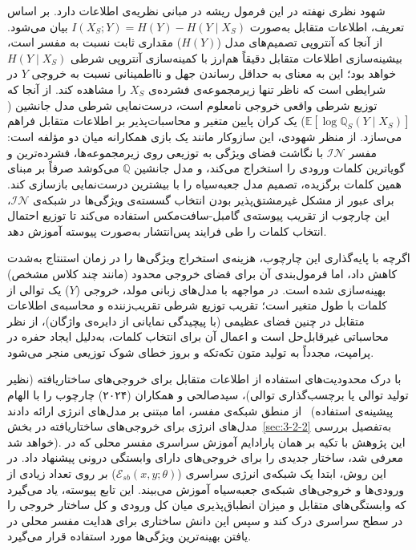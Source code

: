 شهود نظری نهفته در این فرمول ریشه در مبانی نظریه‌ی اطلاعات دارد. بر اساس تعریف، اطلاعات متقابل به‌صورت $I(X_S; Y) = H(Y) - H(Y \mid X_S)$ بیان می‌شود. از آنجا که آنتروپی تصمیم‌های مدل ($H(Y)$) مقداری ثابت نسبت به مفسر است، بیشینه‌سازی اطلاعات متقابل دقیقاً هم‌ارز با کمینه‌سازی آنتروپی شرطی $H(Y \mid X_S)$ خواهد بود؛ این به معنای به حداقل رساندن جهل و نااطمینانی نسبت به خروجی $Y$ در شرایطی است که ناظر تنها زیرمجموعه‌ی فشرده‌ی $X_S$ را مشاهده کند. از آنجا که توزیع شرطی واقعی خروجی نامعلوم است، درست‌نمایی شرطی مدل جانشین ($\mathbb{E}[\log \mathbb{Q}_S(Y \mid X_S)]$) یک کران پایین متغیر و محاسبات‌پذیر بر اطلاعات متقابل فراهم می‌سازد. از منظر شهودی، این سازوکار مانند یک بازی همکارانه میان دو مؤلفه است: مفسر $\mathcal{IN}$ با نگاشت فضای ویژگی به توزیعی روی زیرمجموعه‌ها، فشرده‌ترین و گویاترین کلمات ورودی را استخراج می‌کند، و مدل جانشین $\mathbb{Q}$ می‌کوشد صرفاً بر مبنای همین کلمات برگزیده، تصمیم مدل جعبه‌سیاه را با بیشترین درست‌نمایی بازسازی کند. برای عبور از مشکل غیرمشتق‌پذیر بودن انتخاب گسسته‌ی ویژگی‌ها در شبکه‌ی $\mathcal{IN}$، این چارچوب از تقریب پیوسته‌ی گامبل-سافت‌مکس استفاده می‌کند تا توزیع احتمال انتخاب کلمات را طی فرایند پس‌انتشار به‌صورت پیوسته آموزش دهد.

اگرچه  با پایه‌گذاری این چارچوب، هزینه‌ی استخراج ویژگی‌ها را در زمان استنتاج به‌شدت کاهش داد، اما فرمول‌بندی آن برای فضای خروجی محدود (مانند چند کلاس مشخص) بهینه‌سازی شده است. در مواجهه با مدل‌های زبانی مولد، خروجی ($Y$) یک توالی از کلمات با طول متغیر است؛ تقریب توزیع شرطی تقریب‌زننده و محاسبه‌ی اطلاعات متقابل در چنین فضای عظیمی (با پیچیدگی نمایانی از دایره‌ی واژگان)، از نظر محاسباتی غیرقابل‌حل است و اعمال آن برای انتخاب کلمات، به‌دلیل ایجاد حفره در پرامپت، مجدداً به تولید متون تکه‌تکه و بروز خطای شوک توزیعی منجر می‌شود.

با درک محدودیت‌های استفاده از اطلاعات متقابل برای خروجی‌های ساختاریافته (نظیر تولید توالی یا برچسب‌گذاری توالی)، سیدصالحی و همکاران (۲۰۲۴) چارچوب  را با الهام از منطق شبکه‌ی مفسر، اما مبتنی بر مدل‌های انرژی ارائه دادند~\cite{seyyedsalehi2024sointer} (پیشینه‌ی استفاده مدل‌های انرژی برای خروجی‌های ساختاریافته در بخش~\ref{sec:3-2-2} به‌تفصیل بررسی خواهد شد). این پژوهش با تکیه بر همان پارادایم آموزش سراسری مفسر محلی که در  معرفی شد، ساختار جدیدی را برای خروجی‌های دارای وابستگی درونی پیشنهاد داد. در این روش، ابتدا یک شبکه‌ی انرژی سراسری ($\mathcal{E}_{sb}(x, y; \theta)$) بر روی تعداد زیادی از ورودی‌ها و خروجی‌های شبکه‌ی جعبه‌سیاه آموزش می‌بیند. این تابع پیوسته، یاد می‌گیرد که وابستگی‌های متقابل و میزان انطباق‌پذیری میان کل ورودی و کل ساختار خروجی را در سطح سراسری درک کند و سپس این دانش ساختاری برای هدایت مفسر محلی در یافتن بهینه‌ترین ویژگی‌ها مورد استفاده قرار می‌گیرد.

